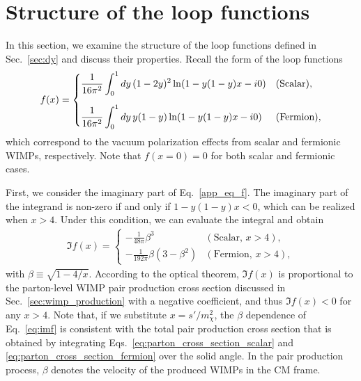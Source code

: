 \documentclass[12pt,twoside,book]{article}
\begin{document}
\section{Structure of the loop functions}
\label{sec:reim}

\vskip 0.1in

In this section, we examine the structure of the loop functions defined in Sec.~\ref{sec:dy} and discuss their properties.
Recall the form of the loop functions
\begin{align}
  f(x) = \begin{cases}
    \displaystyle{\frac{1}{16\pi^2} \int_0^1 dy\, (1-2y)^2 \ln (1-
    y(1-y)x - i0)} & {\rm (Scalar)},\\[5mm]
    \displaystyle{\frac{1}{16\pi^2} \int_0^1 dy\, y(1-y) \ln (1 -
	  y(1-y)x - i0)} & {\rm (Fermion)},
  \end{cases}\label{app_eq_f}
\end{align}
which correspond to the vacuum polarization effects from scalar and fermionic WIMPs, respectively.
Note that $f(x=0) = 0$ for both scalar and fermionic cases.

First, we consider the imaginary part of Eq.~\eqref{app_eq_f}.
The imaginary part of the integrand is non-zero if and only if $1-y(1-y) x < 0$, which can be realized when $x > 4$.
Under this condition, we can evaluate the integral and obtain
\begin{align}
  \Im f(x) = \begin{cases}
    \displaystyle{-\frac{1}{48\pi} \beta^3} & (\text{Scalar}, \,x>4),\\
    \displaystyle{-\frac{1}{192\pi} \beta (3 - \beta^2)} & (\text{Fermion}, \,x>4),
  \end{cases}
  \label{eq:imf}
\end{align}
with $\beta \equiv \sqrt{1-4/x}$.
According to the optical theorem, $\Im f(x)$ is proportional to the parton-level WIMP pair production cross section discussed in Sec.~\ref{sec:wimp_production} with a negative coefficient, and thus $\Im f(x) < 0$ for any $x>4$.
Note that, if we substitute $x = s'/m_\chi^2$, the $\beta$ dependence of Eq.~\eqref{eq:imf} is consistent with the total pair production cross section that is obtained by integrating Eqs.~\eqref{eq:parton_cross_section_scalar} and \eqref{eq:parton_cross_section_fermion} over the solid angle.
In the pair production process, $\beta$ denotes the velocity of the produced WIMPs in the CM frame.
\end{document}
